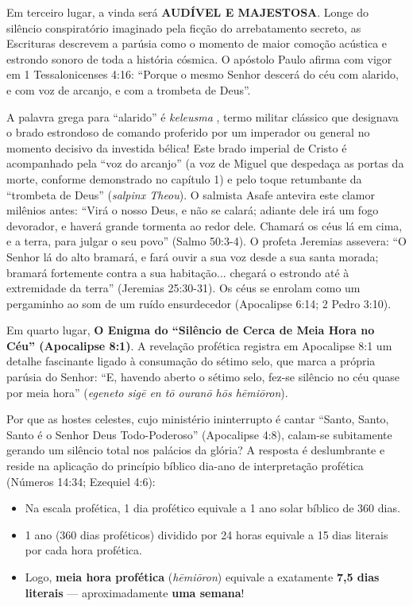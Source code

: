 \documentclass[11pt,a4paper,openany]{book}
\begin{document}
Em terceiro lugar, a vinda será \textbf{AUDÍVEL E MAJESTOSA}.
Longe do silêncio conspiratório imaginado pela ficção do arrebatamento secreto, as Escrituras descrevem a parúsia como o momento de maior comoção acústica e estrondo sonoro de toda a história cósmica. O apóstolo Paulo afirma com vigor em 1 Tessalonicenses 4:16:
``Porque o mesmo Senhor descerá do céu com alarido, e com voz de arcanjo, e com a trombeta de Deus''.

A palavra grega para ``alarido'' é \textit{keleusma} , termo militar clássico que designava o brado estrondoso de comando proferido por um imperador ou general no momento decisivo da investida bélica! Este brado imperial de Cristo é acompanhado pela ``voz do arcanjo'' (a voz de Miguel que despedaça as portas da morte, conforme demonstrado no capítulo 1) e pelo toque retumbante da ``trombeta de Deus'' (\textit{salpinx Theou}).
O salmista Asafe antevira este clamor milênios antes: ``Virá o nosso Deus, e não se calará; adiante dele irá um fogo devorador, e haverá grande tormenta ao redor dele. Chamará os céus lá em cima, e a terra, para julgar o seu povo'' (Salmo 50:3-4). O profeta Jeremias assevera: ``O Senhor lá do alto bramará, e fará ouvir a sua voz desde a sua santa morada; bramará fortemente contra a sua habitação... chegará o estrondo até à extremidade da terra'' (Jeremias 25:30-31). Os céus se enrolam como um pergaminho ao som de um ruído ensurdecedor (Apocalipse 6:14; 2 Pedro 3:10).

Em quarto lugar, \textbf{O Enigma do ``Silêncio de Cerca de Meia Hora no Céu'' (Apocalipse 8:1)}.
A revelação profética registra em Apocalipse 8:1 um detalhe fascinante ligado à consumação do sétimo selo, que marca a própria parúsia do Senhor:
``E, havendo aberto o sétimo selo, fez-se silêncio no céu quase por meia hora'' (\textit{egeneto sigē en tō ouranō hōs hēmiōron}).

Por que as hostes celestes, cujo ministério ininterrupto é cantar ``Santo, Santo, Santo é o Senhor Deus Todo-Poderoso'' (Apocalipse 4:8), calam-se subitamente gerando um silêncio total nos palácios da glória?
A resposta é deslumbrante e reside na aplicação do princípio bíblico dia-ano de interpretação profética (Números 14:34; Ezequiel 4:6):
\begin{itemize}
  \item Na escala profética, 1 dia profético equivale a 1 ano solar bíblico de 360 dias.
  \item 1 ano (360 dias proféticos) dividido por 24 horas equivale a 15 dias literais por cada hora profética.
  \item Logo, \textbf{meia hora profética} (\textit{hēmiōron}) equivale a exatamente \textbf{7,5 dias literais} — aproximadamente \textbf{uma semana}!
\end{itemize}
\end{document}
